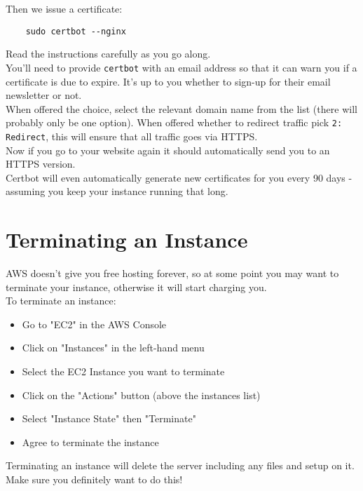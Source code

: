 Then we issue a certificate:

\begin{verbatim}
    sudo certbot --nginx
\end{verbatim}

Read the instructions carefully as you go along.
\\

You'll need to provide \texttt{certbot} with an email address so that it can warn you if a certificate is due to expire. It's up to you whether to sign-up for their email newsletter or not.
\\

When offered the choice, select the relevant domain name from the list (there will probably only be one option). When offered whether to redirect traffic pick \texttt{2: Redirect}, this will ensure that all traffic goes via HTTPS.
\\

Now if you go to your website again it should automatically send you to an HTTPS version.
\\

Certbot will even automatically generate new certificates for you every 90 days - assuming you keep your instance running that long.


\section{Terminating an Instance}

AWS doesn't give you free hosting forever, so at some point you may want to terminate your instance, otherwise it will start charging you.
\\

To terminate an instance:

\begin{itemize}
    \item Go to "EC2" in the AWS Console
    \item Click on "Instances" in the left-hand menu
    \item Select the EC2 Instance you want to terminate
    \item Click on the "Actions" button (above the instances list)
    \item Select "Instance State" then "Terminate"
    \item Agree to terminate the instance
\end{itemize}

Terminating an instance will delete the server including any files and setup on it. Make sure you definitely want to do this!


